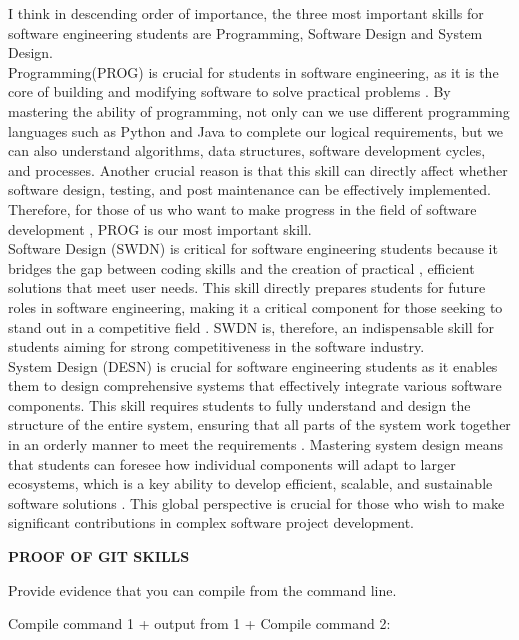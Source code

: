 \documentclass[a4paper, 11pt]{report}
\begin{document}
I think in descending order of importance, the three most important skills for software engineering students are Programming, Software Design and 
System Design.
\\Programming(PROG) is crucial for students in software engineering, as it is the core of building and modifying software to solve practical problems \cite{durlak1998program}. By mastering the ability of programming, not only can we use different programming languages such as Python and Java to complete our logical requirements, but we can also understand algorithms, data structures, software development cycles, and processes. Another crucial reason is that this skill can directly affect whether software design, testing, and post maintenance can be effectively implemented. Therefore, for those of us who want to make progress in the field of software development \cite{bennedsen2005revealing}, PROG is our most important skill.
\\Software Design (SWDN) is critical for software engineering students because it bridges the gap between coding skills and the creation of practical \cite{harel1990software}, efficient solutions that meet user needs. This skill directly prepares students for future roles in software engineering, making it a critical component for those seeking to stand out in a competitive field \cite{zhang2011we}. SWDN is, therefore, an indispensable skill for students aiming for strong competitiveness in the software industry.
\\System Design (DESN) is crucial for software engineering students as it enables them to design comprehensive systems that effectively integrate various software components. This skill requires students to fully understand and design the structure of the entire system, ensuring that all parts of the system work together in an orderly manner to meet the requirements \cite{boland1978process}. Mastering system design means that students can foresee how individual components will adapt to larger ecosystems, which is a key ability to develop efficient, scalable, and sustainable software solutions \cite{vasantha2012review}. This global perspective is crucial for those who wish to make significant contributions in complex software project development.

\textbf{PROOF OF GIT SKILLS}

Provide evidence that you can compile from the command line.

Compile command 1 + output from 1 + Compile command 2:
\end{document}
